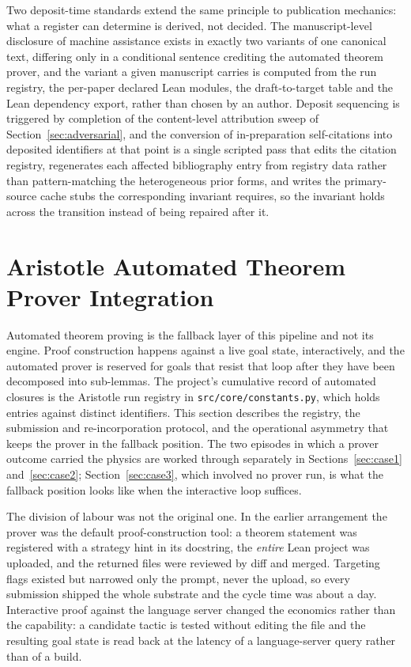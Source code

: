 \documentclass[11pt]{article}
\begin{document}
Two deposit-time standards extend the same principle to publication
mechanics: what a register can determine is derived, not decided.
The manuscript-level disclosure of machine assistance exists in
exactly two variants of one canonical text, differing only in a
conditional sentence crediting the automated theorem prover, and the
variant a given manuscript carries is computed from the run registry,
the per-paper declared Lean modules, the draft-to-target table and
the Lean dependency export, rather than chosen by an author. Deposit
sequencing is triggered by completion of the content-level
attribution sweep of Section~\ref{sec:adversarial}, and the
conversion of in-preparation self-citations into deposited
identifiers at that point is a single scripted pass that edits the
citation registry, regenerates each affected bibliography entry from
registry data rather than pattern-matching the heterogeneous prior
forms, and writes the primary-source cache stubs the corresponding
invariant requires, so the invariant holds across the transition
instead of being repaired after it.

\section{Aristotle Automated Theorem Prover Integration}
\label{sec:three_layer_extended}

Automated theorem proving is the fallback layer of this pipeline and
not its engine. Proof construction happens against a live goal state,
interactively, and the automated prover is reserved for goals that
resist that loop after they have been decomposed into sub-lemmas. The
project's cumulative record of automated closures is the Aristotle run
registry in \texttt{src/core/constants.py}, which holds
\aristotleproved{} entries against \aristotleruns{} distinct
identifiers. This section describes the registry, the submission and
re-incorporation protocol, and the operational asymmetry that keeps
the prover in the fallback position. The two episodes in which a
prover outcome carried the physics are worked through separately in
Sections~\ref{sec:case1} and~\ref{sec:case2};
Section~\ref{sec:case3}, which involved no prover run, is what the
fallback position looks like when the interactive loop suffices.

The division of labour was not the original one. In the earlier
arrangement the prover was the default proof-construction tool: a
theorem statement was registered with a strategy hint in its
docstring, the \emph{entire} Lean project was uploaded, and the
returned files were reviewed by diff and merged. Targeting flags
existed but narrowed only the prompt, never the upload, so every
submission shipped the whole substrate and the cycle time was about a
day. Interactive proof against the language server changed the
economics rather than the capability: a candidate tactic is tested
without editing the file and the resulting goal state is read back at
the latency of a language-server query rather than of a build.
\end{document}
